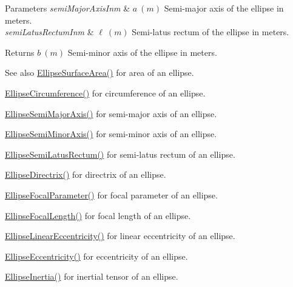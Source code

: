 \begin{DoxyParams}{Parameters}
{\em semi\+Major\+Axis\+Inm} & $ a\ (m)$ Semi-\/major axis of the ellipse in meters. \\
\hline
{\em semi\+Latus\+Rectum\+Inm} & $ \ell\ (m)$ Semi-\/latus rectum of the ellipse in meters. \\
\hline
\end{DoxyParams}
\begin{DoxyReturn}{Returns}
$ b\ (m)$ Semi-\/minor axis of the ellipse in meters. 
\end{DoxyReturn}
\begin{DoxySeeAlso}{See also}
\mbox{\hyperlink{group___e_g_x_math-_geometry-2_d-_ellipse-_surface_area_ga4ce8c8323e9718ce5458f4ab7f6d823d}{Ellipse\+Surface\+Area()}} for area of an ellipse. 

\mbox{\hyperlink{group___e_g_x_math-_geometry-2_d-_ellipse-_circumference_ga4172802ac674eb53467b44928ac635c7}{Ellipse\+Circumference()}} for circumference of an ellipse. 

\mbox{\hyperlink{group___e_g_x_math-_geometry-2_d-_ellipse-_semi_major_axis_ga646a2ca065f4ac3f666a9ea22f3bb527}{Ellipse\+Semi\+Major\+Axis()}} for semi-\/major axis of an ellipse. 

\mbox{\hyperlink{group___e_g_x_math-_geometry-2_d-_ellipse-_semi_minor_axis_gae461acf3333565d69527dd86e9aa2b32}{Ellipse\+Semi\+Minor\+Axis()}} for semi-\/minor axis of an ellipse. 

\mbox{\hyperlink{group___e_g_x_math-_geometry-2_d-_ellipse-_semi_latus_rectum_gacfd1844eb4ef3d1ee3c0b460a6442ae6}{Ellipse\+Semi\+Latus\+Rectum()}} for semi-\/latus rectum of an ellipse. 

\mbox{\hyperlink{group___e_g_x_math-_geometry-2_d-_ellipse-_directrix_gace8f72a8efbc9c18d3eb689151405106}{Ellipse\+Directrix()}} for directrix of an ellipse. 

\mbox{\hyperlink{group___e_g_x_math-_geometry-2_d-_ellipse-_focal_parameter_ga4cd01a38c72c092ef9791351948bf69b}{Ellipse\+Focal\+Parameter()}} for focal parameter of an ellipse. 

\mbox{\hyperlink{group___e_g_x_math-_geometry-2_d-_ellipse-_focal_length_gab8d63de7640c880cfecaeada6f2afdac}{Ellipse\+Focal\+Length()}} for focal length of an ellipse. 

\mbox{\hyperlink{group___e_g_x_math-_geometry-2_d-_ellipse-_linear_eccentricity_gac70b3010e30aa8b73deb50fe2b9b9a91}{Ellipse\+Linear\+Eccentricity()}} for linear eccentricity of an ellipse. 

\mbox{\hyperlink{group___e_g_x_math-_geometry-2_d-_ellipse-_eccentricity_ga6a0a7fba17f782616894cfc447628c33}{Ellipse\+Eccentricity()}} for eccentricity of an ellipse. 

\mbox{\hyperlink{group___e_g_x_math-_geometry-2_d-_ellipse-_inertia_ga10a3049c2f04b50f271fb01dc62e4cf8}{Ellipse\+Inertia()}} for inertial tensor of an ellipse. 
\end{DoxySeeAlso}
